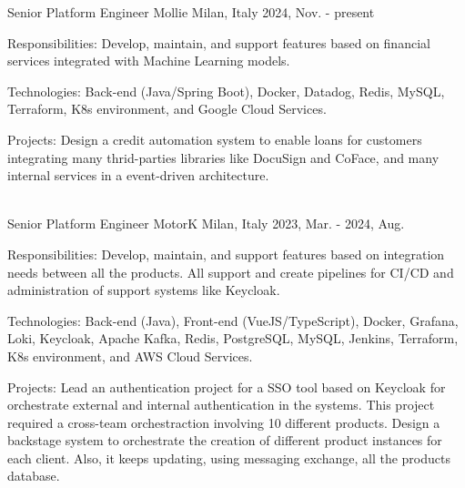 

\begin{cventries}
  \cventry
    {Senior Platform Engineer} %
    {Mollie} %
    {Milan, Italy} %
    {2024, Nov. - present} %
    {
          \begin{cvitems} %
            \item {Responsibilities: Develop, maintain, and support features based on financial services integrated with Machine Learning models.}
            \item {Technologies: Back-end (Java/Spring Boot), Docker, Datadog, Redis, MySQL, Terraform, K8s environment, and Google Cloud Services.}
            \item {Projects: Design a credit automation system to enable loans for customers integrating many thrid-parties libraries like DocuSign and CoFace, and many internal services in a event-driven architecture.}
          \end{cvitems}
    }
\\
  \cventry
    {Senior Platform Engineer} %
    {MotorK} %
    {Milan, Italy} %
    {2023, Mar. - 2024, Aug.} %
    {
          \begin{cvitems} %
            \item {Responsibilities: Develop, maintain, and support features based on integration needs between all the products. All support and create pipelines for CI/CD and administration of support systems like Keycloak.}
            \item {Technologies: Back-end (Java), Front-end (VueJS/TypeScript), Docker, Grafana, Loki, Keycloak, Apache Kafka, Redis, PostgreSQL, MySQL, Jenkins, Terraform, K8s environment, and AWS Cloud Services.}
            \item {Projects: Lead an authentication project for a SSO tool based on Keycloak for orchestrate external and internal authentication in the systems. This project required a cross-team orchestraction involving 10 different products. Design a backstage system to orchestrate the creation of different product instances for each client. Also, it keeps updating, using messaging exchange, all the products database.}
          \end{cvitems}
    }


\end{cventries}
